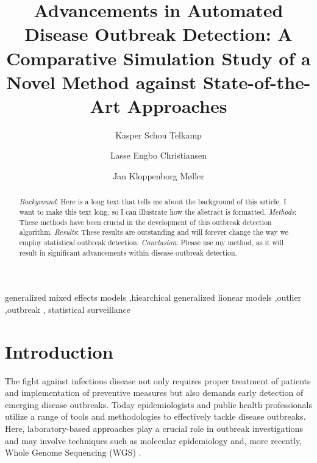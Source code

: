 \documentclass[preprint, 3p, authoryear]{elsarticle} %
\begin{document}
\begin{frontmatter}

  \title{Advancements in Automated Disease Outbreak Detection: A Comparative Simulation Study of a Novel Method against State-of-the-Art Approaches}
    \author[Epidemiology Research]{Kasper Schou Telkamp%
  }
    \author[Epidemiology Research]{Lasse Engbo Christiansen%
  }
    \author[Department of Applied Mathematics and Computer Science]{Jan Kloppenborg Møller%
  }
  
  \begin{abstract}
  \emph{Background}: Here is a long text that tells me about the background of this
  article. I want to make this text long, so I can illustrate how the abstract
  is formatted.
  \emph{Methods}: These methods have been crucial in the development of this outbreak
  detection algorithm.
  \emph{Results}: These results are outstanding and will forever change the way we
  employ statistical outbreak detection.
  \emph{Conclusion}: Please use my method, as it will result in significant
  advancements within disease outbreak detection.
  \end{abstract}
    \begin{keyword}
    generalized mixed effects models \sep hiearchical generalized lionear models \sep outlier \sep outbreak \sep 
    statistical surveillance
  \end{keyword}
  
 \end{frontmatter}

\hypertarget{introduction}{%
\section{Introduction}\label{introduction}}

The fight against infectious disease not only requires proper treatment of patients and implementation of preventive measures but also demands early detection of emerging disease outbreaks. Today epidemiologists and public health professionals utilize a range of tools and methodologies to effectively tackle disease outbreaks. Here, laboratory-based approaches play a crucial role in outbreak investigations and may involve techniques such as molecular epidemiology \citep[\citet{Struelens_2013}]{Honardoost_2018} and, more recently, Whole Genome Sequencing (WGS) \citep[\citet{Baldry_2010}]{Koeser_2012}.
\end{document}
